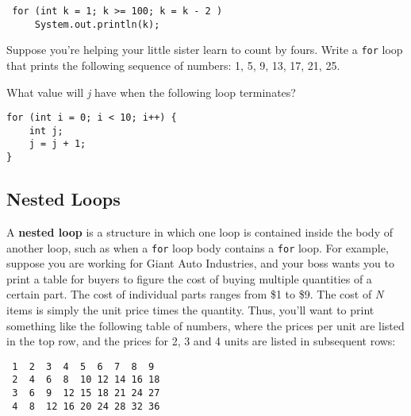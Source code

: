 \begin{SSTUDY}
\begin{EXRLL}
\item 

\begin{jjjlisting}
\begin{lstlisting}
 for (int k = 1; k >= 100; k = k - 2 )
     System.out.println(k);
\end{lstlisting}
\end{jjjlisting}

\end{EXRLL}

\item  Suppose you're helping your little sister learn to count by
fours.  Write a {\tt for} loop that prints the following sequence of numbers:
1, 5, 9, 13, 17, 21, 25.

\item  What value will {\it j} have when the following loop \mbox{terminates?}
\begin{jjjlisting}
\begin{lstlisting}
for (int i = 0; i < 10; i++) {
    int j;
    j = j + 1;
}
\end{lstlisting}
\end{jjjlisting}

\end{SSTUDY}

\subsection{Nested Loops}
\noindent A {\bf nested loop} is a structure in which one loop is contained
inside the body of another loop, such as when a {\tt for} loop body
contains a {\tt for} loop.  For example, suppose you are working for
Giant Auto Industries, and your boss wants you to print a table 
for buyers to figure the cost of buying multiple quantities
of a certain part.  The cost of individual parts ranges from
\$1 to \$9.  The cost of {\it N} items is simply the unit price times the
quantity.  Thus, you'll want to print something like the following
table of numbers, where the prices per unit are listed in the top row,
and the prices for 2, 3 and 4 units are listed in subsequent rows:

\begin{jjjlisting}
\begin{lstlisting}
 1  2  3  4  5  6  7  8  9
 2  4  6  8  10 12 14 16 18
 3  6  9  12 15 18 21 24 27
 4  8  12 16 20 24 28 32 36
\end{lstlisting}
\end{jjjlisting}

